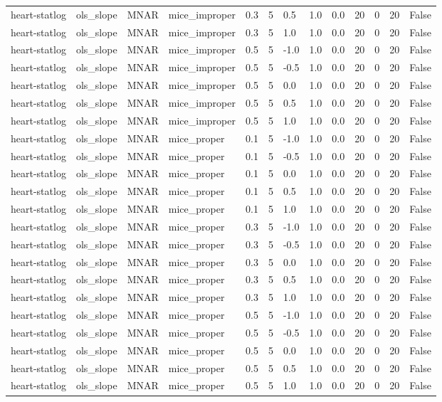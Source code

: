 \begin{tabular}{lllllllllllll}
heart-statlog & ols\_slope & MNAR & mice\_improper & 0.3 & 5 & 0.5 & 1.0 & 0.0 & 20 & 0 & 20 & False \\
heart-statlog & ols\_slope & MNAR & mice\_improper & 0.3 & 5 & 1.0 & 1.0 & 0.0 & 20 & 0 & 20 & False \\
heart-statlog & ols\_slope & MNAR & mice\_improper & 0.5 & 5 & -1.0 & 1.0 & 0.0 & 20 & 0 & 20 & False \\
heart-statlog & ols\_slope & MNAR & mice\_improper & 0.5 & 5 & -0.5 & 1.0 & 0.0 & 20 & 0 & 20 & False \\
heart-statlog & ols\_slope & MNAR & mice\_improper & 0.5 & 5 & 0.0 & 1.0 & 0.0 & 20 & 0 & 20 & False \\
heart-statlog & ols\_slope & MNAR & mice\_improper & 0.5 & 5 & 0.5 & 1.0 & 0.0 & 20 & 0 & 20 & False \\
heart-statlog & ols\_slope & MNAR & mice\_improper & 0.5 & 5 & 1.0 & 1.0 & 0.0 & 20 & 0 & 20 & False \\
heart-statlog & ols\_slope & MNAR & mice\_proper & 0.1 & 5 & -1.0 & 1.0 & 0.0 & 20 & 0 & 20 & False \\
heart-statlog & ols\_slope & MNAR & mice\_proper & 0.1 & 5 & -0.5 & 1.0 & 0.0 & 20 & 0 & 20 & False \\
heart-statlog & ols\_slope & MNAR & mice\_proper & 0.1 & 5 & 0.0 & 1.0 & 0.0 & 20 & 0 & 20 & False \\
heart-statlog & ols\_slope & MNAR & mice\_proper & 0.1 & 5 & 0.5 & 1.0 & 0.0 & 20 & 0 & 20 & False \\
heart-statlog & ols\_slope & MNAR & mice\_proper & 0.1 & 5 & 1.0 & 1.0 & 0.0 & 20 & 0 & 20 & False \\
heart-statlog & ols\_slope & MNAR & mice\_proper & 0.3 & 5 & -1.0 & 1.0 & 0.0 & 20 & 0 & 20 & False \\
heart-statlog & ols\_slope & MNAR & mice\_proper & 0.3 & 5 & -0.5 & 1.0 & 0.0 & 20 & 0 & 20 & False \\
heart-statlog & ols\_slope & MNAR & mice\_proper & 0.3 & 5 & 0.0 & 1.0 & 0.0 & 20 & 0 & 20 & False \\
heart-statlog & ols\_slope & MNAR & mice\_proper & 0.3 & 5 & 0.5 & 1.0 & 0.0 & 20 & 0 & 20 & False \\
heart-statlog & ols\_slope & MNAR & mice\_proper & 0.3 & 5 & 1.0 & 1.0 & 0.0 & 20 & 0 & 20 & False \\
heart-statlog & ols\_slope & MNAR & mice\_proper & 0.5 & 5 & -1.0 & 1.0 & 0.0 & 20 & 0 & 20 & False \\
heart-statlog & ols\_slope & MNAR & mice\_proper & 0.5 & 5 & -0.5 & 1.0 & 0.0 & 20 & 0 & 20 & False \\
heart-statlog & ols\_slope & MNAR & mice\_proper & 0.5 & 5 & 0.0 & 1.0 & 0.0 & 20 & 0 & 20 & False \\
heart-statlog & ols\_slope & MNAR & mice\_proper & 0.5 & 5 & 0.5 & 1.0 & 0.0 & 20 & 0 & 20 & False \\
heart-statlog & ols\_slope & MNAR & mice\_proper & 0.5 & 5 & 1.0 & 1.0 & 0.0 & 20 & 0 & 20 & False \\
\hline
\end{tabular}

